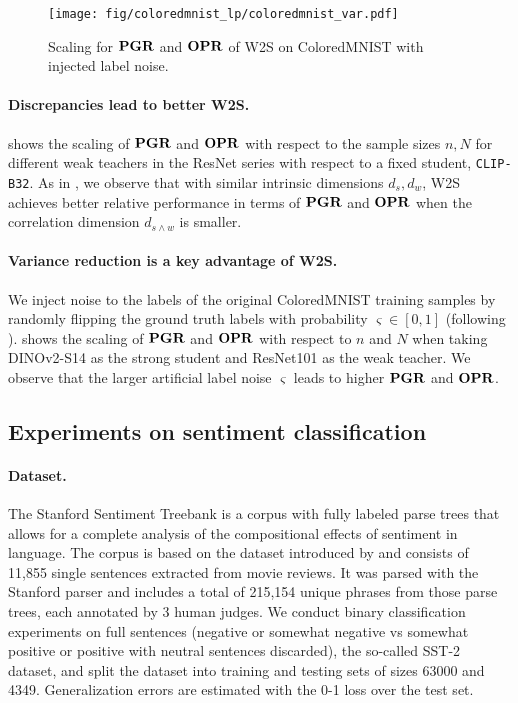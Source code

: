 \begin{figure}[!h]
    \centering
    \texttt{[image: fig/coloredmnist\_lp/coloredmnist\_var.pdf]}%
    \caption{Scaling for $\mathbf{PGR}$ and $\mathbf{OPR}$ of W2S on ColoredMNIST with injected label noise.}\label{fig:coloredmnist_variance}
\end{figure}

\paragraph{Discrepancies lead to better W2S.}
 shows the scaling of $\mathbf{PGR}$ and $\mathbf{OPR}$ with respect to the sample sizes $n, N$ for different weak teachers in the ResNet series with respect to a fixed student, \texttt{CLIP-B32}. 
As in , we observe that with similar intrinsic dimensions $d_s, d_w$, W2S achieves better relative performance in terms of $\mathbf{PGR}$ and $\mathbf{OPR}$ when the correlation dimension $d_{s \wedge w}$ is smaller.

\paragraph{Variance reduction is a key advantage of W2S.}
We inject noise to the labels of the original ColoredMNIST training samples by randomly flipping the ground truth labels with probability $\varsigma \in [0,1]$ (following \cite{arjovsky2019invariant}). 
 shows the scaling of $\mathbf{PGR}$ and $\mathbf{OPR}$ with respect to $n$ and $N$ when taking DINOv2-S14 as the strong student and ResNet101 as the weak teacher. We observe that the larger artificial label noise $\varsigma$ leads to higher $\mathbf{PGR}$ and $\mathbf{OPR}$. 

\subsection{Experiments on sentiment classification}\label{apx:exp_nlp_cls}

\paragraph{Dataset.} The Stanford Sentiment Treebank \citep{socher-etal-2013-sst2} is a corpus with fully labeled parse trees that allows for a complete analysis of the compositional effects of sentiment in language. The corpus is based on the dataset introduced by \citet{pang-lee-2005-sst_original_corpus} and consists of 11,855 single sentences extracted from movie reviews. It was parsed with the Stanford parser and includes a total of 215,154 unique phrases from those parse trees, each annotated by 3 human judges. We conduct binary classification experiments on full sentences (negative or somewhat negative vs somewhat positive or positive with neutral sentences discarded), the so-called SST-2 dataset, and split the dataset into training and testing sets of sizes 63000 and 4349. Generalization errors are estimated with the 0-1 loss over the test set.

